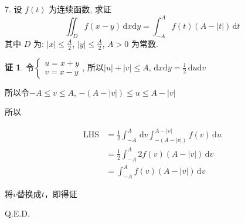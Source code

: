 \documentclass[a4paper,12pt]{article}
\theoremstyle{definition}
\newtheorem*{pf}{证}
\begin{document}
7. 设 $f(t)$ 为连续函数, 求证
$$\iint_{D} f(x - y)\,\mathrm{d}x\mathrm{d}y = \int_{-A}^{A} f(t)\left(A - |t|\right)\,\mathrm{d}t$$
其中 $D$ 为: $|x| \leq \frac{A}{2}$, $|y| \leq \frac{A}{2}$, $A > 0$ 为常数.
\begin{pf}
    令$\begin{cases}
            u=x+y \\
            v=x-y
        \end{cases}$, 所以$|u|+|v|\leq A$, $\mathrm{d}x\mathrm{d}y=\frac{1}{2}\,\mathrm{d}u\mathrm{d}v$

    所以令$-A\leq v\leq A$, $-(A-|v|)\leq u\leq A-|v|$

    所以

    \begin{align*}
        \text{LHS}
         & =\frac{1}{2}\int_{-A}^A\,\mathrm{d}v\int_{-(A-|v|)}^{A-|v|}f(v)\,\mathrm{d}u \\
         & =\frac{1}{2}\int_{-A}^A2f(v)(A-|v|)\,\mathrm{d}v                             \\
         & =\int_{-A}^Af(v)(A-|v|)\,\mathrm{d}v
    \end{align*}

    将$v$替换成$t$，即得证

    Q.E.D.
\end{pf}
\end{document}
